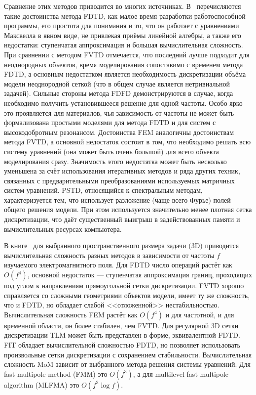 Сравнение этих методов приводится во многих источниках.
В~\cite{Inan-FDTD-2011} перечисляются такие достоинства метода FDTD,
как малое время разработки работоспособной программы, его простота
для понимания и то, что он работает с уравнениями Максвелла в явном
виде, не привлекая приёмы линейной алгебры, а также его недостатки:
ступенчатая аппроксимация и большая вычислительная сложность.  При
сравнении с методом FVTD отмечается, что последний лучше подходит для
неоднородных объектов, время моделирования сопоставимо с временем
метода FDTD, а основным недостатком является необходимость
дискретизации объёма модели неоднородной сеткой (что в общем случае
является нетривиальной задачей).  Сильные стороны метода FDFD
демонстрируются в случае, когда необходимо получить установившееся
решение для одной частоты.  Особо ярко это проявляется для материалов,
чья зависимость от частоты не может быть формализована простыми
моделями для метода FDTD и для систем с высокодобротным резонансом.
Достоинства FEM аналогичны достоинствам метода FVTD, а основной
недостаток состоит в том, что необходимо решать всю систему уравнений
(она может быть очень большой) для всего объекта моделирования
сразу. Значимость этого недостатка может быть несколько уменьшена за
счёт использования итеративных методов и ряда других техник, связанных
с предварительными преобразованиями используемых матричных систем
уравнений.  PSTD, относящийся к спектральным методам, характеризуется
тем, что использует разложение (чаще всего Фурье) полей общего решения
модели.  При этом используется значительно менее плотная сетка
дискретизации, что даёт существенный выигрыш в задействованных памяти
и вычислительных ресурсах компьютера.

В книге~\cite{Bondenson-CEM-2005} для выбранного пространственного
размера задачи (3D) приводится вычислительная сложность разных методов
в зависимости от частоты $f$ изучаемого электромагнитного поля.  Для
FDTD число операций растёт как $O(f^4)$, основной недостаток ---
ступенчатая аппроксимация границ, проходящих под углом к направлениям
прямоугольной сетки дискретизации.  FVTD хорошо справляется со
сложными геометриями объектов модели, имеет ту же сложность, что и
FDTD, но обладает слабой <<отложенной>> нестабильностью.
Вычислительная сложность FEM растёт как $O(f^4)$ и для частотной, и
для временной области, он более стабилен, чем FVTD.  Для регулярной 3D
сетки дискретизации TLM может быть представлен в форме, эквивалентной
FDTD.  FIT обладает вычислительной сложностью FDTD, но позволяет
использовать произвольные сетки дискретизации с сохранением
стабильности.  Вычислительная сложность MoM зависит от выбранного
метода решения системы уравнений.  Для fast multipole method (FMM) это
$O(f^3)$, а для multilevel fast multipole algorithm (MLFMA) это
$O(f^2\log f)$.

